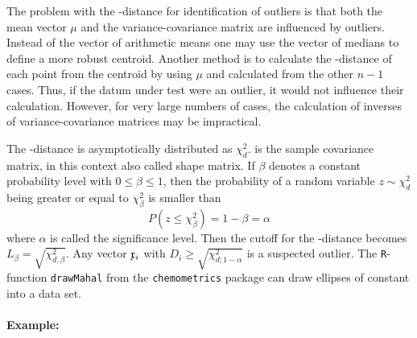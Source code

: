 \begin{refsection}
The problem with the -distance for identification of outliers is that both the mean vector \(\mu \) and the variance-covariance matrix  are influenced by outliers. Instead of the vector of arithmetic means one may use the vector of medians to define a more robust centroid. Another method is to calculate the -distance of each point from the centroid by using \(\mu \) and  calculated from the other \(n-1 \) cases. Thus, if the datum under test were an outlier, it would not influence their calculation. However, for very large numbers of cases, the calculation of  inverses of  variance-covariance matrices may be impractical.

The -distance is asymptotically distributed as \(\chi^2_d \).  is the sample covariance matrix, in this context also called shape matrix. If \(\beta \) denotes a constant probability level with \(0 \leq \beta \leq 1 \), then the probability of a random variable \(z \sim \chi^2_d \) being greater or equal to \(\chi^2_\beta \) is smaller than
\begin{equation}
   P(z \leq \chi^2_\beta) = 1 - \beta = \alpha
\end{equation}
where \(\alpha \) is called the significance level. Then the cutoff for the -distance becomes \(L_\beta = \sqrt{\chi^2_{d,\beta}} \). Any vector \(\mathfrak{x}_i \) with \(D_i \geq \sqrt{\chi^2_{d;1-\alpha}} \) is a suspected outlier. The \texttt{R}-function \texttt{drawMahal} from the \texttt{chemometrics} package can draw ellipses of constant  into a data set.

\paragraph{Example:}


\end{refsection}
